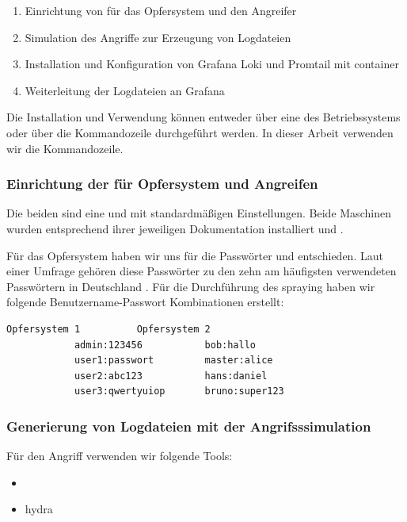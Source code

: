 \begin{enumerate}[noitemsep]
   \item Einrichtung von  für das Opfersystem und den Angreifer
   \item Simulation des Angriffe zur Erzeugung von Logdateien
   \item Installation und Konfiguration von Grafana Loki und Promtail mit \gls{container}
   \item Weiterleitung der Logdateien an Grafana
\end{enumerate}

Die Installation und Verwendung können entweder über eine  des Betriebssystems oder über die Kommandozeile durchgeführt werden. In dieser Arbeit verwenden wir die Kommandozeile.

\subsubsection{Einrichtung der  für Opfersystem und Angreifen}
Die beiden  sind eine  und  mit standardmäßigen Einstellungen. Beide Maschinen wurden entsprechend ihrer jeweiligen Dokumentation installiert \citep{kali_vm} und \citep{Ubuntu_server}.

Für das Opfersystem haben wir uns für die Passwörter  und  entschieden. Laut einer Umfrage gehören diese Passwörter zu den zehn am häufigsten verwendeten Passwörtern in Deutschland \citep{silicon_passwort}. Für die Durchführung des \gls{spraying} haben wir folgende Benutzername-Passwort Kombinationen erstellt:

{
\begin{lstlisting}[frame=single]
            Opfersystem 1          Opfersystem 2  
            admin:123456           bob:hallo
            user1:passwort         master:alice
            user2:abc123           hans:daniel
            user3:qwertyuiop       bruno:super123
\end{lstlisting}
}

\newpage
\subsubsection{Generierung von Logdateien mit der Angrifsssimulation}
Für den Angriff verwenden wir folgende Tools:

{
\begin{itemize}[noitemsep]
   \item	{}
   \item \gls{hydra}
\end{itemize}
}

